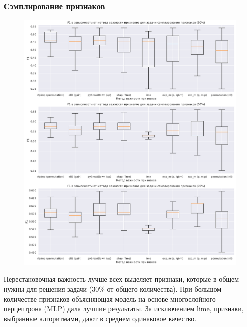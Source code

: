 \documentclass[12pt]{article}
\begin{document}
\subsubsection{Сэмплирование признаков}
\begin{figure}[h]
\centering
\includegraphics[width=\textwidth]{images/diabets_f1_feature_size.pdf}
\end{figure}

Перестановочная важность лучше всех выделяет признаки, которые в общем нужны для решения задачи (30\% от общего количества). При большом количестве признаков объясняющая модель на основе многослойного перцептрона (MLP) дала лучшие результаты. За исключением lime, признаки, выбранные алгоритмами, дают в среднем одинаковое качество.

\newpage
\end{document}
